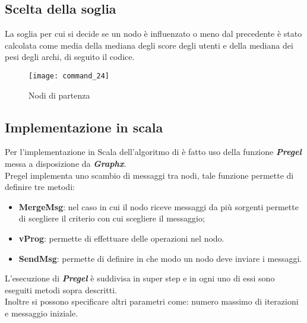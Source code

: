 \subsection{Scelta della soglia}
La soglia per cui si decide se un nodo è influenzato o meno dal precedente è stato
calcolata come media della mediana degli score degli utenti e della mediana dei pesi
degli archi, di seguito il codice.

\begin{figure}[!htbp]
  \texttt{[image: command\_24]}
  \caption{Nodi di partenza}
  \label{command_24}
\end{figure}
\clearpage

\subsection{Implementazione in scala}
Per l'implementazione in Scala dell'algoritmo di è fatto uso della funzione \textit{\textbf{Pregel}}
messa a disposizione da \textit{\textbf{Graphx}}.\\
Pregel implementa uno scambio di messaggi tra nodi, tale funzione permette di definire tre
metodi:
\begin{itemize}
	\item \textbf{MergeMsg}: nel caso in cui il nodo riceve messaggi da più sorgenti permette
	di scegliere il criterio con cui scegliere il messaggio;
	\item \textbf{vProg}: permette di effettuare delle operazioni nel nodo.
	\item \textbf{SendMsg}: permette di definire in che modo un nodo deve inviare i messaggi.
\end{itemize}
L'esecuzione di \textit{\textbf{Pregel}} è suddivisa in super step e in ogni uno di essi
sono eseguiti metodi sopra descritti.\\
Inoltre si possono specificare altri parametri come: numero massimo di iterazioni e messaggio iniziale.
